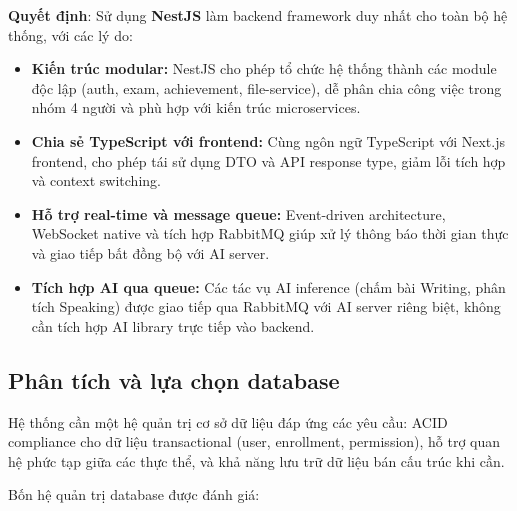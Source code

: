 \textbf{Quyết định}: Sử dụng \textbf{NestJS} làm backend framework duy nhất cho toàn bộ hệ thống, với các lý do:

\begin{itemize}
\item \textbf{Kiến trúc modular:} NestJS cho phép tổ chức hệ thống thành các module độc lập (auth, exam, achievement, file-service), dễ phân chia công việc trong nhóm 4 người và phù hợp với kiến trúc microservices.
\item \textbf{Chia sẻ TypeScript với frontend:} Cùng ngôn ngữ TypeScript với Next.js frontend, cho phép tái sử dụng DTO và API response type, giảm lỗi tích hợp và context switching.
\item \textbf{Hỗ trợ real-time và message queue:} Event-driven architecture, WebSocket native và tích hợp RabbitMQ giúp xử lý thông báo thời gian thực và giao tiếp bất đồng bộ với AI server.
\item \textbf{Tích hợp AI qua queue:} Các tác vụ AI inference (chấm bài Writing, phân tích Speaking) được giao tiếp qua RabbitMQ với AI server riêng biệt, không cần tích hợp AI library trực tiếp vào backend.
\end{itemize}

\subsection{Phân tích và lựa chọn database}

Hệ thống cần một hệ quản trị cơ sở dữ liệu đáp ứng các yêu cầu: ACID compliance cho dữ liệu transactional (user, enrollment, permission), hỗ trợ quan hệ phức tạp giữa các thực thể, và khả năng lưu trữ dữ liệu bán cấu trúc khi cần.

Bốn hệ quản trị database được đánh giá:

\begin{table}[H]
    \centering
    \caption{So sánh database theo yêu cầu dự án}
    \label{tab:db_comparison}
    \scriptsize
\end{table}

